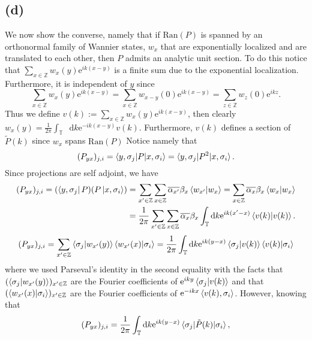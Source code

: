 \documentclass[a4paper,11pt]{article}
\newcommand{\euler}[1]{\text{e}^{#1}}
\newcommand{\Ran}[1]{\text{Ran}\left(#1\right)}
\newcommand*\diff{\mathop{}\!\mathrm{d}}
\newcommand{\Z}{\mathbb{Z}}
\numberwithin{equation}{section}
\begin{document}
 	 \subsection*{(d)}
 	 We now show the converse, namely that if $ \Ran{P} $ is spanned by an orthonormal family of Wannier states, $ w_x $ that are exponentially localized and are translated to each other, then $ P $ admits an analytic unit section.
 	 To do this notice that $ \sum_{x\in\Z} w_x(y)\euler{ik(x-y)} $ is a finite sum due to the exponential localization. Furthermore, it is independent of $ y $ since \begin{equation}
 	 \sum_{x\in\Z} w_x(y)\euler{ik(x-y)}=\sum_{x\in\Z} w_{x-y}(0)\euler{ik(x-y)}=\sum_{z\in\Z} w_z(0)\euler{ikz}.
 	 \end{equation}
 	 Thus we define $ v(k):=\sum_{x\in\Z} w_x(y)\euler{ik(x-y)} $, then clearly $ w_x(y)=\frac{1}{2\pi}\int_{\mathbb{T}}\diff k\euler{-ik(x-y)}v(k) $. Furthermore, $ v(k) $ defines a section of $ \tilde{P}(k) $ since $ w_x$ spans $\Ran{P} $ Notice namely that\begin{equation}
 	 (P_{yx})_{j,i}=\braket{y,\sigma_j|P|x,\sigma_i}=\braket{y,\sigma_j|P^2|x,\sigma_i}.
 	 \end{equation} Since projections are self adjoint, we have \begin{equation}
 	 \begin{aligned}
 	 (P_{yx})_{j,i}=(\bra{y,\sigma_j}P)(P\ket{x,\sigma_i})=\sum_{x'\in\Z}\sum_{x\in\Z}\overline{\alpha_{x'}}\beta_{x}\braket{w_{x'}|w_x}=\sum_{x\in\Z}\overline{\alpha_{x}}\beta_{x}\braket{w_{x}|w_x}\\=\frac{1}{2\pi}\sum_{x'\in\Z}\sum_{x\in\Z}\overline{\alpha_{x}}\beta_{x}\int_{\mathbb{T}}\diff k \euler{ik(x'-x)}\braket{v(k)|v(k)}.
 	 \end{aligned}
 	 \end{equation}
 	 \begin{equation}
 	 \begin{aligned}
 	 (P_{yx})_{j,i}=\sum_{x'\in\Z}\braket{\sigma_j|w_{x'}(y)}\braket{w_{x'}(x)|\sigma_i}=\frac{1}{2\pi}\int_{\mathbb{T}}\diff k\euler{ik(y-x)}\braket{\sigma_j|v(k)}\braket{v(k)|\sigma_i}
 	 \end{aligned}
 	 \end{equation}
 	 where we used Parseval's identity in the second equality with the facts that $ (\braket{\sigma_j|w_{x'}(y)})_{x'\in\Z} $ are the Fourier coefficients of $ \euler{iky}\braket{\sigma_j|v(k)} $ and that $ (\braket{w_{x'}(x)|\sigma_i})_{x'\in\Z} $ are the Fourier coefficients of $ \euler{-ikx}\braket{v(k),\sigma_i} $. However, knowing that \begin{equation}
 	 (P_{yx})_{j,i}=\frac{1}{2\pi}\int_{\mathbb{T}}\diff k\euler{ik(y-x)}\braket{\sigma_j|\tilde{P}(k)|\sigma_i},
 	 \end{equation}
\end{document}

